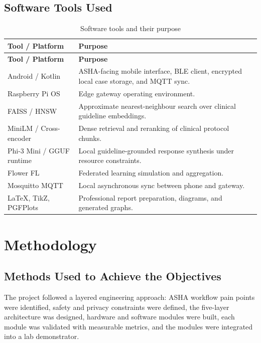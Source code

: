 \documentclass[12pt,a4paper,openany]{report}
\begin{document}
\section{Software Tools Used}
\begin{longtable}{p{}p{}}
\caption{Software tools and their purpose}\\
\toprule
\textbf{Tool / Platform} & \textbf{Purpose}\\
\midrule
\endfirsthead
\toprule
\textbf{Tool / Platform} & \textbf{Purpose}\\
\midrule
\endhead
Android / Kotlin & ASHA-facing mobile interface, BLE client, encrypted local case storage, and MQTT sync.\\
Raspberry Pi OS & Edge gateway operating environment.\\
FAISS / HNSW & Approximate nearest-neighbour search over clinical guideline embeddings.\\
MiniLM / Cross-encoder & Dense retrieval and reranking of clinical protocol chunks.\\
Phi-3 Mini / GGUF runtime & Local guideline-grounded response synthesis under resource constraints.\\
Flower FL & Federated learning simulation and aggregation.\\
Mosquitto MQTT & Local asynchronous sync between phone and gateway.\\
LaTeX, TikZ, PGFPlots & Professional report preparation, diagrams, and generated graphs.\\
\bottomrule
\end{longtable}

\chapter{Methodology}

\section{Methods Used to Achieve the Objectives}
The project followed a layered engineering approach: ASHA workflow pain points were identified, safety and privacy constraints were defined, the five-layer architecture was designed, hardware and software modules were built, each module was validated with measurable metrics, and the modules were integrated into a lab demonstrator.
\end{document}
